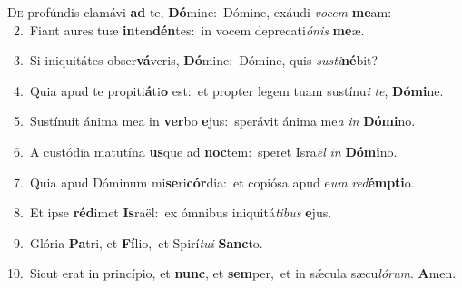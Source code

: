 \lettrine{\initial\textcolor{\initialcolor}{D}}{e} profúndis clamávi \textbf{ad} te, \textbf{Dó}\-mine:~\star Dómine, exáudi \textit{vo}\-\textit{cem} \textbf{me}\-am:\\
{\numbfont\textcolor{\numbcolor}{~2.}}~Fiant aures tuæ \textbf{in}\-ten\-\textbf{dén}\-tes:~\star in vocem deprecati\-\textit{ó}\-\textit{nis} \textbf{me}\-æ.\par
{\numbfont\textcolor{\numbcolor}{~3.}}~Si iniquitátes obser\-\textbf{vá}\-veris, \textbf{Dó}\-mine:~\star Dómine, quis \textit{sus}\-\textit{ti}\textbf{né}bit?\par
{\numbfont\textcolor{\numbcolor}{~4.}}~Quia apud te propiti\-\textbf{á}\-ti\textbf{o} est:~\star et propter legem tuam sustínu\textit{i} \textit{te}\-, \textbf{Dó}\-\textbf{mi}ne.\par
{\numbfont\textcolor{\numbcolor}{~5.}}~Sustínuit ánima mea in \textbf{ver}\-bo \textbf{e}\-jus:~\star sperávit ánima me\textit{a} \textit{in} \textbf{Dó}\-\textbf{mi}no.\par
{\numbfont\textcolor{\numbcolor}{~6.}}~A custódia matutína \textbf{us}\-que ad \textbf{noc}\-tem:~\star speret Isra\textit{ël} \textit{in} \textbf{Dó}\-\textbf{mi}no.\par
{\numbfont\textcolor{\numbcolor}{~7.}}~Quia apud Dóminum mi\-\textbf{se}\-ri\-\textbf{cór}\-dia:~\star et copiósa apud e\textit{um} \textit{red}\-\textbf{émp}\textbf{ti}o.\par
{\numbfont\textcolor{\numbcolor}{~8.}}~Et ipse \textbf{réd}\-imet \textbf{Is}\-raël:~\star ex ómnibus iniquitá\-\textit{ti}\-\textit{bus} \textbf{e}\-jus.\par
{\numbfont\textcolor{\numbcolor}{~9.}}~Glória \textbf{Pa}\-tri, et \textbf{Fí}\-lio,~\star et Spirí\-\textit{tu}\-\textit{i} \textbf{Sanc}\-to.\par
{\numbfont\textcolor{\numbcolor}{10.}}~Sicut erat in princípio, et \textbf{nunc}\-, et \textbf{sem}\-per,~\star et in sǽcula sæcu\-\textit{ló}\-\textit{rum}. \textbf{A}\-men.\par
